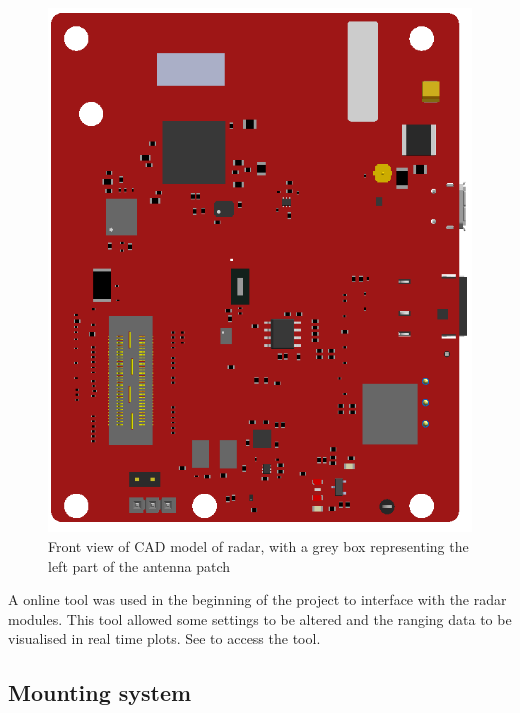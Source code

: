 \begin{figure}[H]
\begin{minipage}[b]{0.49\textwidth}
        \includegraphics[width=\textwidth]{Figures/CAD/radarAntenna.PNG}
        \caption{Front view of CAD model of radar, with a grey box representing the left part of the antenna patch}
        \label{fig:radarAntenna}
    \end{minipage}
\end{figure}

A online tool was used in the beginning of the project to interface with the radar modules. This tool allowed some settings to be altered and the ranging data to be visualised in real time plots. See \cite{mmwaveVisualizerWebsite} to access the tool.

\subsection{Mounting system}

